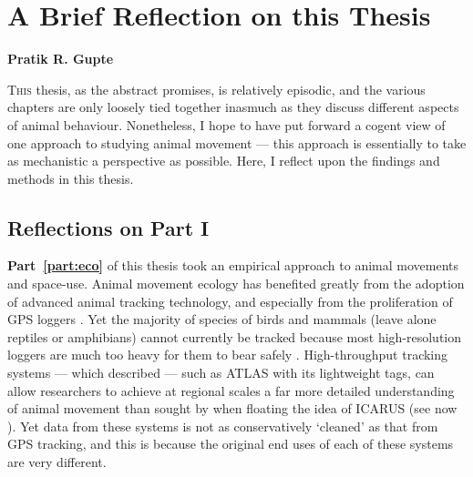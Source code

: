 
%
\chapter{A Brief Reflection on this Thesis}\label{ch:discussion}

{\noindent \textbf{Pratik R. Gupte}}

\lettrine{T}{his} thesis, as the abstract promises, is relatively episodic, and the various chapters are only loosely tied together inasmuch as they discuss different aspects of animal behaviour.
Nonetheless, I hope to have put forward a cogent view of one approach to studying animal movement --- this approach is essentially to take as mechanistic a perspective as possible.
Here, I reflect upon the findings and methods in this thesis.

\section*{Reflections on Part I}

\textbf{Part~\ref{part:eco}} of this thesis took an empirical approach to animal movements and space-use.
Animal movement ecology has benefited greatly from the adoption of advanced animal tracking technology, and especially from the proliferation of GPS loggers \citep{cagnacci2010}.
Yet the majority of species of birds and mammals (leave alone reptiles or amphibians) cannot currently be tracked because most high-resolution loggers are much too heavy for them to bear safely \parencite{kays2015}.
High-throughput tracking systems --- which \textcite{nathan2022} described --- such as ATLAS with its lightweight tags, can allow researchers to achieve at regional scales a far more detailed understanding of animal movement than sought by \textcite{wikelski2007} when floating the idea of ICARUS (see now \cite{jetz2022}).
Yet data from these systems is not as conservatively `cleaned' as that from GPS tracking, and this is because the original end uses of each of these systems are very different.

